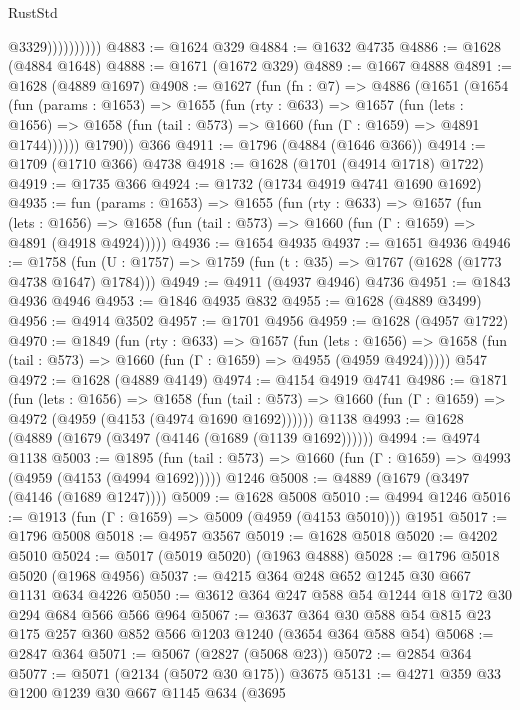 \begin{lexlean}{RustStd}
\begin{coremodule}
                        @3329))))))))))
@4883 := @1624 @329
@4884 := @1632 @4735
@4886 := @1628 (@4884 @1648)
@4888 := @1671 (@1672 @329)
@4889 := @1667 @4888
@4891 := @1628 (@4889 @1697)
@4908 := @1627
    (fun (fn : @7) =>
    @4886
      (@1651
        (@1654
          (fun (params : @1653) =>
          @1655
            (fun (rty : @633) =>
            @1657
              (fun (lets : @1656) =>
              @1658 (fun (tail : @573) => @1660 (fun (Γ : @1659) => @4891 @1744))))))
        @1790))
    @366
@4911 := @1796 (@4884 (@1646 @366))
@4914 := @1709 (@1710 @366) @4738
@4918 := @1628 (@1701 (@4914 @1718) @1722)
@4919 := @1735 @366
@4924 := @1732 (@1734 @4919 @4741 @1690 @1692)
@4935 := fun (params : @1653) =>
  @1655
    (fun (rty : @633) =>
    @1657
      (fun (lets : @1656) =>
      @1658 (fun (tail : @573) => @1660 (fun (Γ : @1659) => @4891 (@4918 @4924)))))
@4936 := @1654 @4935
@4937 := @1651 @4936
@4946 := @1758 (fun (U : @1757) => @1759 (fun (t : @35) => @1767 (@1628 (@1773 @4738 @1647) @1784)))
@4949 := @4911 (@4937 @4946) @4736
@4951 := @1843 @4936 @4946
@4953 := @1846 @4935 @832
@4955 := @1628 (@4889 @3499)
@4956 := @4914 @3502
@4957 := @1701 @4956
@4959 := @1628 (@4957 @1722)
@4970 := @1849
    (fun (rty : @633) =>
    @1657
      (fun (lets : @1656) =>
      @1658 (fun (tail : @573) => @1660 (fun (Γ : @1659) => @4955 (@4959 @4924)))))
    @547
@4972 := @1628 (@4889 @4149)
@4974 := @4154 @4919 @4741
@4986 := @1871
    (fun (lets : @1656) =>
    @1658
      (fun (tail : @573) => @1660 (fun (Γ : @1659) => @4972 (@4959 (@4153 (@4974 @1690 @1692))))))
    @1138
@4993 := @1628 (@4889 (@1679 (@3497 (@4146 (@1689 (@1139 @1692))))))
@4994 := @4974 @1138
@5003 := @1895
    (fun (tail : @573) => @1660 (fun (Γ : @1659) => @4993 (@4959 (@4153 (@4994 @1692)))))
    @1246
@5008 := @4889 (@1679 (@3497 (@4146 (@1689 @1247))))
@5009 := @1628 @5008
@5010 := @4994 @1246
@5016 := @1913 (fun (Γ : @1659) => @5009 (@4959 (@4153 @5010))) @1951
@5017 := @1796 @5008
@5018 := @4957 @3567
@5019 := @1628 @5018
@5020 := @4202 @5010
@5024 := @5017 (@5019 @5020) (@1963 @4888)
@5028 := @1796 @5018 @5020 (@1968 @4956)
@5037 := @4215 @364 @248 @652 @1245 @30 @667 @1131 @634 @4226
@5050 := @3612 @364 @247 @588 @54 @1244 @18 @172 @30 @294 @684 @566 @566 @964
@5067 := @3637 @364 @30 @588 @54 @815 @23 @175 @257 @360 @852 @566 @1203 @1240 (@3654 @364 @588 @54)
@5068 := @2847 @364
@5071 := @5067 (@2827 (@5068 @23))
@5072 := @2854 @364
@5077 := @5071 (@2134 (@5072 @30 @175)) @3675
@5131 := @4271
    @359
    @33
    @1200
    @1239
    @30
    @667
    @1145
    @634
    (@3695

\end{coremodule}
\end{lexlean}
